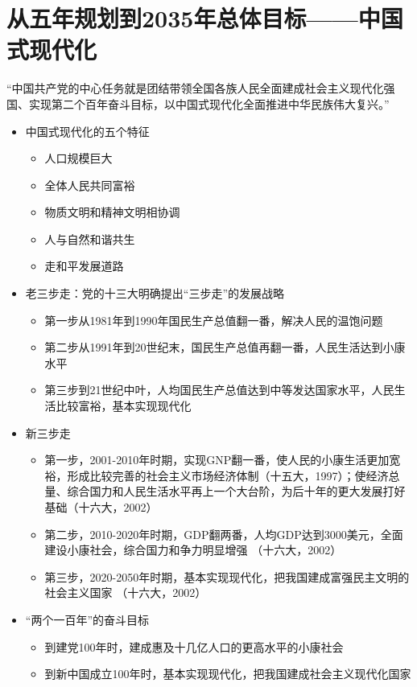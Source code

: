 \documentclass[12pt,openany]{ctexbook}
\begin{document}
\section{从五年规划到2035年总体目标——中国式现代化}
“中国共产党的中心任务就是团结带领全国各族人民全面建成社会主义现代化强国、实现第二个百年奋斗目标，以中国式现代化全面推进中华民族伟大复兴。”
\begin{itemize}
  \item 中国式现代化的五个特征
\begin{itemize}
  \item 人口规模巨大
  \item 全体人民共同富裕
  \item 物质文明和精神文明相协调
  \item 人与自然和谐共生
  \item 走和平发展道路
\end{itemize}
  \item 老三步走：党的十三大明确提出“三步走”的发展战略
\begin{itemize}
  \item 第一步从1981年到1990年国民生产总值翻一番，解决人民的温饱问题
  \item 第二步从1991年到20世纪末，国民生产总值再翻一番，人民生活达到小康水平
  \item 第三步到21世纪中叶，人均国民生产总值达到中等发达国家水平，人民生活比较富裕，基本实现现代化
\end{itemize}
  \item 新三步走
\begin{itemize}
  \item 第一步，2001-2010年时期，实现GNP翻一番，使人民的小康生活更加宽裕，形成比较完善的社会主义市场经济体制（十五大，1997）；使经济总量、综合国力和人民生活水平再上一个大台阶，为后十年的更大发展打好基础（十六大，2002）
  \item 第二步，2010-2020年时期，GDP翻两番，人均GDP达到3000美元，全面建设小康社会，综合国力和争力明显增强 （十六大，2002）
  \item 第三步，2020-2050年时期，基本实现现代化，把我国建成富强民主文明的社会主义国家 （十六大，2002）
\end{itemize}
  \item “两个一百年”的奋斗目标
\begin{itemize}
  \item 到建党100年时，建成惠及十几亿人口的更高水平的小康社会
  \item 到新中国成立100年时，基本实现现代化，把我国建成社会主义现代化国家
\end{itemize}

\end{itemize}
\end{document}
